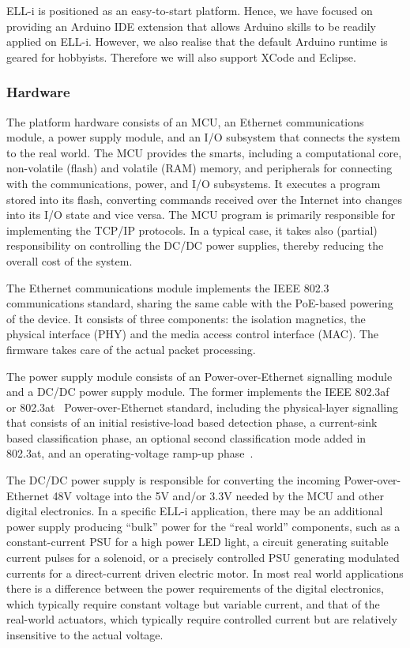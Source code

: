 \documentclass{siamltex}
\begin{document}
ELL-i is positioned as an easy-to-start platform.
Hence, we have focused on providing an Arduino IDE
extension that allows Arduino skills to be readily applied on ELL-i.
However, we also realise that the default Arduino runtime is geared
for hobbyists.  Therefore we will also support XCode and Eclipse.

\subsubsection{Hardware}

The platform hardware consists of an MCU, an Ethernet
communications module, a power supply module, and an I/O subsystem
that connects the system to the real world.  The MCU provides the
smarts, including a computational core, non-volatile (flash) and
volatile (RAM) memory, and peripherals for connecting with the
communications, power, and I/O subsystems.  It executes a program
stored into its flash, converting commands received over the Internet
into changes into its I/O state and vice versa.  The MCU program is
primarily responsible for implementing the TCP/IP protocols.  In a
typical case, it takes also (partial) responsibility on controlling
the DC/DC power supplies, thereby reducing the overall cost of the
system.

The Ethernet communications module implements the IEEE 802.3~\cite{802.3}
communications standard, sharing the same cable with the PoE-based
powering of the device.  It consists of three components: the
isolation magnetics, the physical interface (PHY) and the media access
control interface (MAC).  The firmware takes care of the actual packet
processing.

The power supply module consists of an Power-over-Ethernet signalling
module and a DC/DC power supply module.  The former implements the
IEEE 802.3af~\cite{802.3af} or 802.3at~\cite{802.3at}
Power-over-Ethernet standard, including the physical-layer signalling
that consists of an initial resistive-load based detection phase, a
current-sink based classification phase, an optional second
classification mode added in 802.3at, and an operating-voltage ramp-up
phase~\cite{802.3at}.  

The DC/DC power supply is responsible for converting the incoming
Power-over-Ethernet 48V voltage into the 5V and/or 3.3V needed by the
MCU and other digital electronics.  In a specific ELL-i application,
there may be an additional power supply producing ``bulk'' power for
the ``real world'' components, such as a constant-current PSU for a
high power LED light, a circuit generating suitable current pulses for
a solenoid, or a precisely controlled PSU generating modulated
currents for a direct-current driven electric motor.  In most real
world applications there is a difference between the power
requirements of the digital electronics, which typically require
constant voltage but variable current, and that of the real-world
actuators, which typically require controlled current but are
relatively insensitive to the actual voltage.
\end{document}
